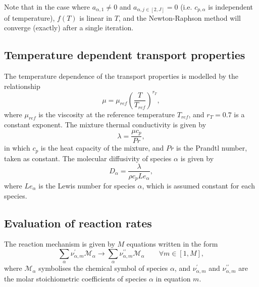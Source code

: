 \documentclass[notitlepage]{revtex4-1}
\begin{document}
Note that in the case where $a_{\alpha,1}\ne0$ and $a_{\alpha,j\in\left[2,J\right]}=0$ (i.e. $c_{p,\alpha}$ is independent of temperature), $f\left(T\right)$ is linear in $T$, and the Newton-Raphson method will converge (exactly) after a single iteration.


\subsection{Temperature dependent transport properties}

The temperature dependence of the transport properties is modelled by the relationship
\begin{equation}\mu=\mu_{ref}\left(\frac{T}{T_{ref}}\right)^{r_{T}},\label{eq:tdtp_mu}\end{equation}
where $\mu_{ref}$ is the viscosity at the reference temperature $T_{ref}$, and $r_{T}=0.7$ is a constant exponent. The mixture thermal conductivity is given by
\begin{equation}\lambda=\frac{\mu{c}_{p}}{Pr},\end{equation}
in which $c_{p}$ is the heat capacity of the mixture, and $Pr$ is the Prandtl number, taken as constant. The molecular diffusivity of species $\alpha$ is given by
\begin{equation}D_{\alpha}=\frac{\lambda}{\rho{c}_{p}Le_{\alpha}},\end{equation}
where $Le_{\alpha}$ is the Lewis number for species $\alpha$, which is assumed constant for each species.



\subsection{Evaluation of reaction rates}

The reaction mechanism is given by $M$ equations written in the form
\begin{equation}\displaystyle\sum_{\alpha}\nu_{\alpha,m}^{\prime}\mathcal{M}_{\alpha}\rightarrow\displaystyle\sum_{\alpha}\nu_{\alpha,m}^{\prime\prime}\mathcal{M}_{\alpha}\qquad\forall{m}\in\left[1,M\right],\end{equation}
where $\mathcal{M}_{\alpha}$ symbolises the chemical symbol of species $\alpha$, and 
$\nu_{\alpha,m}^{\prime}$ and $\nu_{\alpha,m}^{\prime\prime}$ are the molar stoichiometric coefficients of species $\alpha$ in equation $m$.
\end{document}
